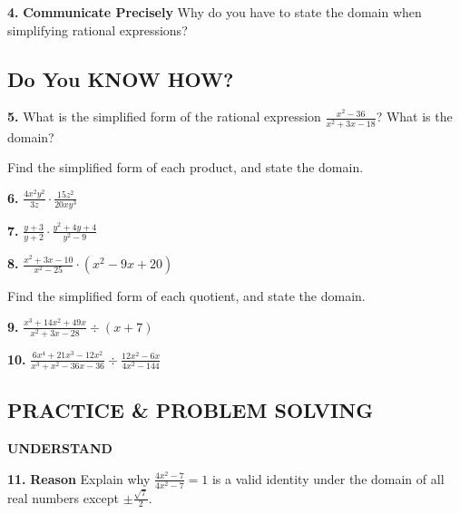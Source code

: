 \documentclass{article}
\newenvironment{practice}[2]{\textbf{#1.}}{\vspace{1em}}
\newcommand{\answer}[1]{}
\newcommand{\uncertain}[2]{#1}
\begin{document}
\begin{practice}{4}{\uncertain{?}{missing DOK}}
\textbf{Communicate Precisely} Why do you have to state the domain when simplifying rational expressions?
\answer{}
\end{practice}


\subsection*{Do You KNOW HOW?}

\begin{practice}{5}{\uncertain{?}{missing DOK}}
What is the simplified form of the rational expression $\frac{x^2-36}{x^2+3x-18}$? What is the domain?
\answer{}
\end{practice}

Find the simplified form of each product, and state the domain.

\begin{practice}{6}{\uncertain{?}{missing DOK}}
$\frac{4x^2y^2}{3z} \cdot \frac{15z^2}{20xy^3}$
\answer{}
\end{practice}

\begin{practice}{7}{\uncertain{?}{missing DOK}}
$\frac{y+3}{y+2} \cdot \frac{y^2+4y+4}{y^2-9}$
\answer{}
\end{practice}

\begin{practice}{8}{\uncertain{?}{missing DOK}}
$\frac{x^2+3x-10}{x^2-25} \cdot (x^2-9x+20)$
\answer{}
\end{practice}

Find the simplified form of each quotient, and state the domain.

\begin{practice}{9}{\uncertain{?}{missing DOK}}
$\frac{x^3+14x^2+49x}{x^2+3x-28} \div (x+7)$
\answer{}
\end{practice}

\begin{practice}{10}{\uncertain{?}{missing DOK}}
$\frac{6x^4+21x^3-12x^2}{x^3+x^2-36x-36} \div \frac{12x^2-6x}{4x^2-144}$
\answer{}
\end{practice}


\subsection*{PRACTICE \& PROBLEM SOLVING}

\textbf{UNDERSTAND}

\begin{practice}{11}{\uncertain{?}{missing DOK}}
\textbf{Reason} Explain why $\frac{4x^2-7}{4x^2-7} = 1$ is a valid identity under the domain of all real numbers except $\pm \frac{\sqrt{7}}{2}$.
\answer{}
\end{practice}
\end{document}
